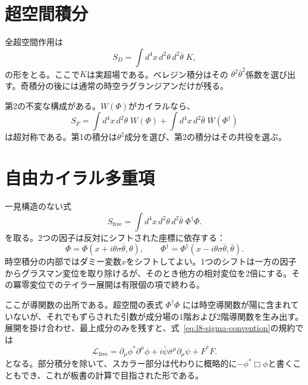\section{超空間積分}

全超空間作用は
\begin{equation}
S_D=\int d^4x\,d^2\theta\,d^2\bar\theta\;K,
\label{eq:l8-D-term-action}
\end{equation}
の形をとる。ここで\(K\)は実超場である。ベレジン積分はその
\(\theta^2\bar\theta^2\)係数を選び出す。奇積分の後には通常の時空ラグランジアンだけが残る。

第2の不変な構成がある。\(W(\Phi)\)がカイラルなら、
\begin{equation}
S_F=\int d^4x\,d^2\theta\;W(\Phi)
+\int d^4x\,d^2\bar\theta\;\overline{W}(\Phi^\dagger)
\label{eq:l8-F-term-action}
\end{equation}
は超対称である。第1の積分は\(\theta^2\)成分を選び、第2の積分はその共役を選ぶ。

\begin{classroomqa}
\end{classroomqa}

\section{自由カイラル多重項}

一見構造のない式
\begin{equation}
S_{\mathrm{free}}
=\int d^4x\,d^2\theta\,d^2\bar\theta\;
\Phi^\dagger\Phi.
\label{eq:l8-free-superaction}
\end{equation}
を取る。2つの因子は反対にシフトされた座標に依存する：
\begin{equation}
\Phi=\Phi(x+i\theta\sigma\bar\theta,\theta),
\qquad
\Phi^\dagger
=\Phi^\dagger(x-i\theta\sigma\bar\theta,\bar\theta).
\end{equation}
時空積分の内部ではダミー変数\(x\)をシフトしてよい。1つのシフトは一方の因子からグラスマン変位を取り除けるが、そのとき他方の相対変位を2倍にする。その冪零変位でのテイラー展開は有限個の項で終わる。

ここが導関数の出所である。超空間の表式
\(\Phi^\dagger\Phi\)
には時空導関数が陽に含まれていないが、それでもずらされた引数が成分場の1階および2階導関数を生み出す。展開を掛け合わせ、最上成分のみを残すと、式~\eqref{eq:l8-sigma-convention}の規約では
\begin{equation}
\mathcal L_{\mathrm{free}}
=\partial_\mu\phi^\ast\partial^\mu\phi
+i\bar\psi\bar\sigma^\mu\partial_\mu\psi
+F^\ast F.
\label{eq:l8-free-component-lagrangian}
\end{equation}
となる。部分積分を除いて、スカラー部分は代わりに概略的に\(-\phi^\ast\Box\phi\)と書くこともでき、これが板書の計算で目指された形である。

